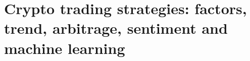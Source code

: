 \chapter{Crypto trading strategies: factors, trend, arbitrage, sentiment and machine learning}\label{crypto-trading-strategies}



